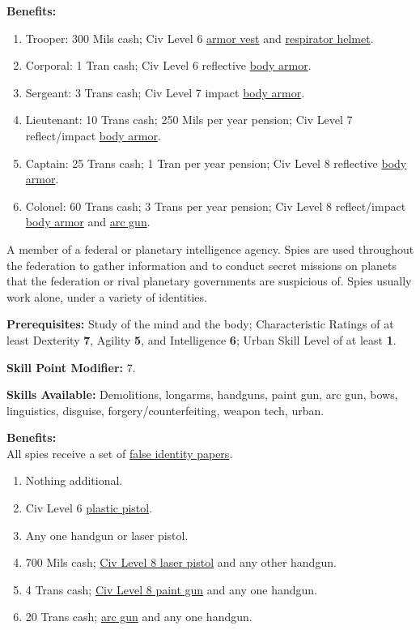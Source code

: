\pagebreak[2]
\textbf{Benefits:} 
\begin{enumerate}
\item Trooper: 300 Mils cash; Civ Level 6 \hyperlink{tag:armor-vest}{armor vest} and \hyperlink{tag:respirator-helmet}{respirator
  helmet}.
\item Corporal: 1 Tran cash; Civ Level 6 reflective \hyperlink{tag:body-armor}{body armor}.
\item Sergeant: 3 Trans cash; Civ Level 7 impact \hyperlink{tag:body-armor}{body armor}.
\item Lieutenant: 10 Trans cash; 250 Mils per year pension; Civ Level
  7 reflect/impact \hyperlink{tag:body-armor}{body armor}.
\item Captain: 25 Trans cash; 1 Tran per year pension; Civ Level 8
  reflective \hyperlink{tag:body-armor}{body armor}.
\item Colonel: 60 Trans cash; 3 Trans per year pension; Civ Level 8
  reflect/impact \hyperlink{tag:body-armor}{body armor} and \hyperlink{tag:arcgun}{arc gun}.
\end{enumerate}

\bigskip

\pagebreak[2]

 \label{sec:prof-spy}

A member of a federal or planetary intelligence agency.  Spies are
used throughout the federation to gather information and to conduct
secret missions on planets that the federation or rival planetary
governments are suspicious of. Spies usually work alone, under a
variety of identities.
  
\textbf{Prerequisites:} Study of the mind and the body; Characteristic
Ratings of at least Dexterity \textbf{7}, Agility \textbf{5}, and
Intelligence \textbf{6}; Urban Skill Level of at least \textbf{1}.

\textbf{Skill Point Modifier:} 7.

\textbf{Skills Available:} Demolitions, longarms, handguns, paint gun,
arc gun, bows, linguistics, disguise,
forgery/\linebreak[0]counterfeiting, weapon 
tech, urban.  

\pagebreak[2]
\textbf{Benefits:}\\
All spies receive a set of \hyperlink{tag:false-identity}{false identity papers}.
\begin{enumerate}
\item Nothing additional. 
\item Civ Level 6 \hyperlink{tag:plastic-pistol}{plastic pistol}. 
\item Any one handgun or laser pistol.   
\item 700 Mils cash; \hyperlink{tag:cl8-laser}{Civ Level 8 laser pistol} and any other handgun. 
\item 4 Trans cash; \hyperlink{tag:cl8-paintgun}{Civ Level 8 paint gun} and any one  handgun. 
\item 20 Trans cash; \hyperlink{tag:arcgun}{arc gun} and any one handgun.  
\end{enumerate}

